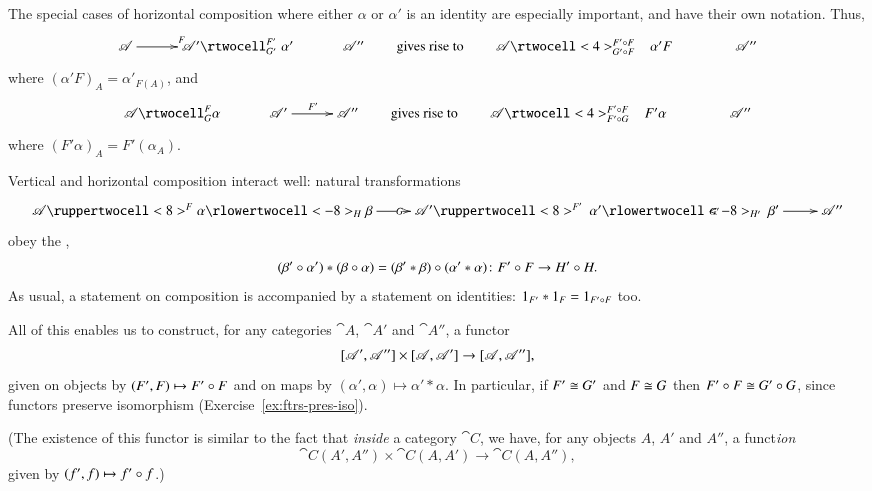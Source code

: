 \begin{remarks}
The special%
%
\label{p:special-cases}
%
cases of horizontal composition where either $\alpha$ or $\alpha'$ is an
identity are especially important, and have their own notation.  Thus,
\[
\xymatrix@C+.5em{
\cat{A}
\ar[r]^F        &
\cat{A}'
\rtwocell^{F'}_{G'}{\hspace{.3em}\alpha'}    &
\cat{A}''
}
\qquad
\text{gives rise to}
\qquad
\xymatrix@C+1.5em{
\cat{A} \rtwocell<4>^{F'\of F}_{G'\of F}{\hspace{.8em}\alpha' F}      &\cat{A}''
}%
%
\ntn{whisker-right}
%
\]
where $(\alpha' F)_A = \alpha'_{F(A)}$, and
\[
\xymatrix@C+.5em{
\cat{A}
\rtwocell^F_G{\alpha}   &
\cat{A}'
\ar[r]^{F'}     &
\cat{A}''
}
\qquad
\text{gives rise to}
\qquad
\xymatrix@C+1.5em{
\cat{A} \rtwocell<4>^{F'\of F}_{F' \of G}{\hspace{.8em}F' \alpha} &
\cat{A}''
}%
%
\ntn{whisker-left}
%
\]
where $(F'\alpha)_A = F'(\alpha_A)$.

Vertical and horizontal composition interact well: natural transformations
\[
\xymatrix{
\cat{A}
\ruppertwocell<8>^F{\alpha}
\ar[r]|G
\rlowertwocell<-8>_H{\beta} &
\cat{A}'
\ruppertwocell<8>^{F'}{\hspace{.2em}\alpha'}
\ar[r]|{G'}
\rlowertwocell<-8>_{H'}{\hspace{.2em}\beta'} &
\cat{A}''
}
\]
obey the ,%
%
%
\[
(\beta' \of \alpha') * (\beta \of \alpha)
=
(\beta' * \beta) \of (\alpha' * \alpha)
\from
F' \of F \to H' \of H.
\]
As usual, a statement on composition is accompanied by a statement on
identities: $1_{F'} * 1_F = 1_{F' \mathbin{\circ} F}$ too.

All of this enables us to construct, for any categories $\cat{A}$,
$\cat{A}'$ and $\cat{A}''$, a functor
\[
\ftrcat{\cat{A}'}{\cat{A}''}
\times
\ftrcat{\cat{A}}{\cat{A}'}
\to
\ftrcat{\cat{A}}{\cat{A}''},
%
\index{functor!category}
%
\]
given on objects by $(F', F) \mapsto F' \mathbin{\circ} F$ and on maps by $(\alpha',
\alpha) \mapsto \alpha' * \alpha$.  In particular, if $F' \cong G'$ and $F
\cong G$ then $F' \mathbin{\circ} F \cong G' \mathbin{\circ} G$, since functors preserve isomorphism
(Exercise~\ref{ex:ftrs-pres-iso}).

(The existence of this functor is similar to the fact that \emph{inside} a
category $\cat{C}$, we have, for any objects $A$, $A'$ and $A''$, a
funct\emph{ion}
\[
\cat{C}(A', A'') \times \cat{C}(A, A') \to \cat{C}(A, A''),
\]
given by $(f', f) \mapsto f' \mathbin{\circ} f$.)


\end{remarks}
